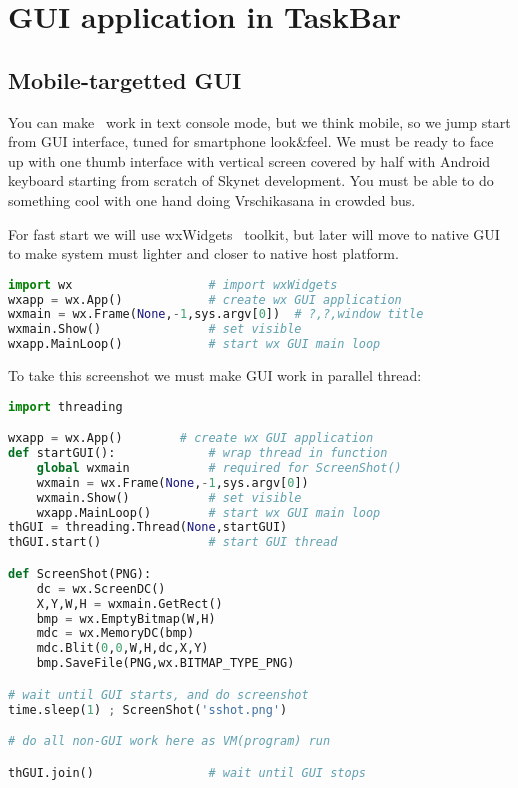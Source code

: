 \chapter{GUI application in TaskBar}\clearpage

\section{Mobile-targetted GUI}
You can make \F\ work in text console mode, but we think mobile, so we jump
start from GUI interface, tuned for smartphone look\&feel. We must be ready to
face up with one thumb interface with vertical screen covered by half
with Android keyboard starting from scratch of Skynet development. You must be
able to do something cool with one hand doing Vrschikasana in crowded bus.

For fast start we will use wxWidgets \cite{zetwx}\ toolkit,
but later will
move to native GUI to make system must lighter and closer to native host
platform.

\begin{lstlisting}[language=python]
import wx					# import wxWidgets
wxapp = wx.App()			# create wx GUI application
wxmain = wx.Frame(None,-1,sys.argv[0])	# ?,?,window title
wxmain.Show()				# set visible
wxapp.MainLoop()			# start wx GUI main loop
\end{lstlisting}


To take this screenshot we must make GUI work in parallel thread:
\begin{lstlisting}[language=python]
import threading

wxapp = wx.App()		# create wx GUI application
def startGUI():				# wrap thread in function
	global wxmain			# required for ScreenShot()
	wxmain = wx.Frame(None,-1,sys.argv[0])
	wxmain.Show()			# set visible
	wxapp.MainLoop()		# start wx GUI main loop
thGUI = threading.Thread(None,startGUI)
thGUI.start()				# start GUI thread

def ScreenShot(PNG):
	dc = wx.ScreenDC()
	X,Y,W,H = wxmain.GetRect()
	bmp = wx.EmptyBitmap(W,H)
	mdc = wx.MemoryDC(bmp)
	mdc.Blit(0,0,W,H,dc,X,Y)
	bmp.SaveFile(PNG,wx.BITMAP_TYPE_PNG)

# wait until GUI starts, and do screenshot
time.sleep(1) ; ScreenShot('sshot.png')

# do all non-GUI work here as VM(program) run

thGUI.join()				# wait until GUI stops
\end{lstlisting}

